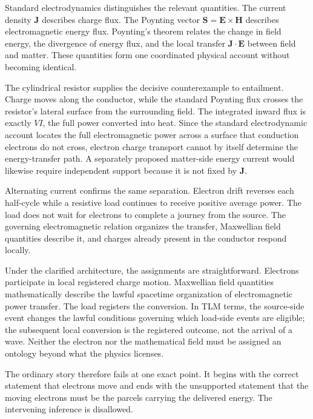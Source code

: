 \documentclass[12pt,onecolumn]{article}
\begin{document}
Standard electrodynamics distinguishes the relevant quantities. The current density $\mathbf J$ describes charge flux. The Poynting vector $\mathbf S=\mathbf E\times\mathbf H$ describes electromagnetic energy flux. Poynting's theorem relates the change in field energy, the divergence of energy flux, and the local transfer $\mathbf J\cdot\mathbf E$ between field and matter. These quantities form one coordinated physical account without becoming identical.

The cylindrical resistor supplies the decisive counterexample to entailment. Charge moves along the conductor, while the standard Poynting flux crosses the resistor's lateral surface from the surrounding field. The integrated inward flux is exactly $VI$, the full power converted into heat. Since the standard electrodynamic account locates the full electromagnetic power across a surface that conduction electrons do not cross, electron charge transport cannot by itself determine the energy-transfer path. A separately proposed matter-side energy current would likewise require independent support because it is not fixed by $\mathbf J$.

Alternating current confirms the same separation. Electron drift reverses each half-cycle while a resistive load continues to receive positive average power. The load does not wait for electrons to complete a journey from the source. The governing electromagnetic relation organizes the transfer, Maxwellian field quantities describe it, and charges already present in the conductor respond locally.

Under the clarified architecture, the assignments are straightforward. Electrons participate in local registered charge motion. Maxwellian field quantities mathematically describe the lawful spacetime organization of electromagnetic power transfer. The load registers the conversion. In TLM terms, the source-side event changes the lawful conditions governing which load-side events are eligible; the subsequent local conversion is the registered outcome, not the arrival of a wave. Neither the electron nor the mathematical field must be assigned an ontology beyond what the physics licenses.

The ordinary story therefore fails at one exact point. It begins with the correct statement that electrons move and ends with the unsupported statement that the moving electrons must be the parcels carrying the delivered energy. The intervening inference is disallowed.

\vspace{1em}
\end{document}
